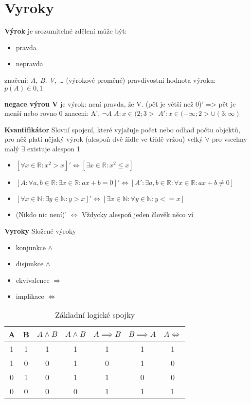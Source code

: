 \documentclass{article}
\theoremstyle{definition}
\begin{document}
\section{Vyroky}

\textbf{Výrok} je srozumitelné zdělení
může být:
\begin{itemize}
  \item pravda
  \item  nepravda
\end{itemize}
značení: \textit{A, B, V, \dots} (výrokové proměné)
pravdivostní hodnota výroku: $ p(A) \in {0, 1} $

\textbf{negace výrou V} je výrok: není pravda, že V.
(pět je větší než 0)' => pět je menší nebo rovno 0
znaceni: A', $ \neg A $
$ A: x \in (2;3> $
$ A': x \in (-\infty;2> \cup (3;\infty) $

\textbf{Kvantifikátor} 
Slovní spojení, které vyjařuje počet nebo odhad počtu objektů, pro něž platí nějaký výrok (alespoň dvě židle ve třídě vržou)
velký $ \forall $ pro vsechny
malý $ \exists $ existuje alespon 1
\begin{itemize}
    \item $ [\forall x \in \mathbb{R}: x^2 > x]' \Leftrightarrow [ \exists x \in \mathbb{R}: x^2 \leq x ]$

\item $ [A: \forall a, b \in \mathbb{R}: \exists x \in \mathbb{R}: ax + b = 0]' \Leftrightarrow [A': \exists a, b \in \mathbb{R}: \forall x \in \mathbb{R}: ax +b \not= 0 ]$

\item $[ \forall x \in \mathbb{N} : \exists y \in \mathbb{N}: y > x]' \Leftrightarrow [\exists x \in \mathbb{N}: \forall y \in \mathbb{N}: y <= x ]$

\item (Nikdo nic není)' $ \Leftrightarrow $ Vždycky alespoň jeden člověk něco ví
\end{itemize}

\textbf{Vyroky}
Složené výroky
\begin{itemize}
    \item konjunkce $ \wedge $
    \item disjunkce $ \land $
    \item ekvivalence $ \Rightarrow $
    \item implikace $ \Leftrightarrow $ 
\end{itemize}

\begin{table}
\caption{Základní logické spojky}
\centering
  \begin{tabular}{c c | c | c | c | c | c |}

      A & B & $ A \land B $ & $ A \wedge B $ & $ A \implies B $ & $ B \implies A $ & $ A \Leftrightarrow $ \\
      \hline
      1 & 1 & 1 & 1 & 1 & 1 & 1 \\
      1 & 0 & 0 & 1 & 0 & 1 & 0 \\
      0 & 1 & 0 & 1 & 1 & 0 & 0 \\
      0 & 0 & 0 & 0 & 1 & 1 & 1 \\

  \end{tabular}
\end{table}
\end{document}
